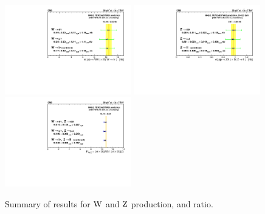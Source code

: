 \begin{figure}
\begin{center}
  \includegraphics[width=0.49\textwidth]{figs/Results_W.pdf}
  \includegraphics[width=0.49\textwidth]{figs/Results_Z.pdf}
  \\
  \includegraphics[width=0.49\textwidth]{figs/Results_R_WZ.pdf}
\caption[.]{\label{fig:WZ_LEPstylePlots}
Summary of results for $\mathrm{W}$ and $\mathrm{Z}$ production, and ratio. }
\end{center}
\end{figure}

